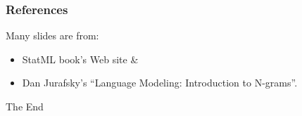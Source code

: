 \documentclass{beamer}
\begin{document}















\begin{frame} \frametitle{References}
Many slides are from:
\begin{itemize}
\item StatML book's Web site \&
\item Dan Jurafsky's
``Language Modeling: Introduction to N-grams''. 
\end{itemize}

\end{frame}

\begin{frame}
\Huge{\centerline{The End}}
\end{frame}

\end{document}
